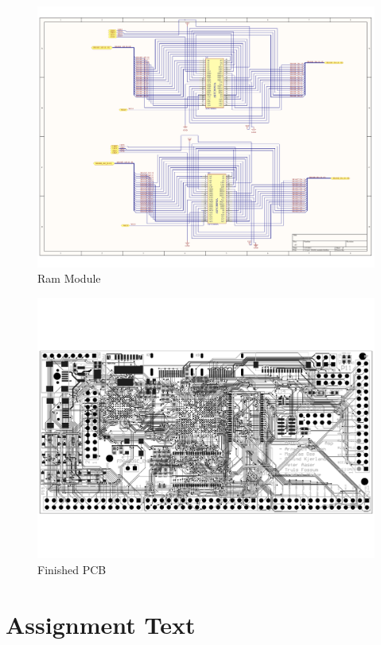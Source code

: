 \begin{figure}
    \includegraphics[width=\linewidth]{img/RAM_module.pdf}
    \caption{Ram Module}
    \label{fig:RAM_module}
\end{figure}

\begin{figure}
    \includegraphics[width=\linewidth]{img/PCB_Finished.pdf}
    \caption{Finished PCB}
    \label{fig:PCB_Finished}
\end{figure}

\chapter{Assignment Text}
\label{app:assignment_text}



